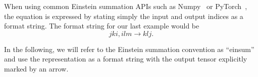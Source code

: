 \noindent When using common Einstein summation APIs such as Numpy~\cite{Numpy} or PyTorch~\cite{PyTorch}, the equation is expressed by stating simply the input and output indices as a format string. The format string for our last example would be
$$jki, ilm \rightarrow klj.$$

\noindent In the following, we will refer to the Einstein summation convention as ``einsum'' and use the representation as a format string with the output tensor explicitly marked by an arrow.
